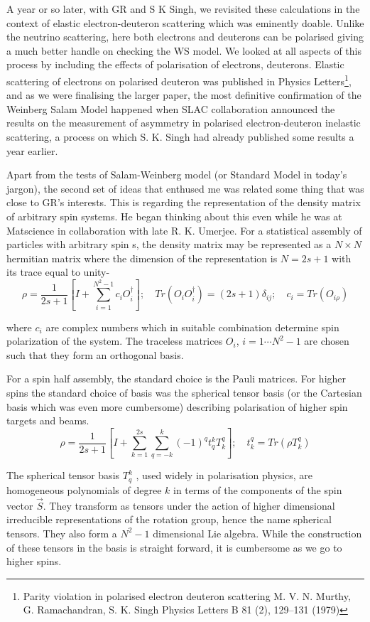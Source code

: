 A year or so later, with GR and S K Singh, we revisited these calculations in the context of elastic electron-deuteron scattering which was eminently doable. Unlike the neutrino scattering, here both electrons and deuterons can be polarised giving a much better handle on checking the WS model. We looked at all aspects of this process by including the effects of polarisation of electrons, deuterons. Elastic scattering of electrons on polarised deuteron was published in Physics Letters\footnote{Parity violation in polarised electron deuteron scattering M. V. N. Murthy, G. Ramachandran, S. K. Singh Physics Letters B 81 (2), 129--131 (1979)}, and as we were finalising the larger paper, the most definitive confirmation of the Weinberg Salam Model happened when SLAC collaboration announced the results on the measurement of asymmetry in polarised electron-deuteron inelastic scattering, a process on which S. K. Singh had already published some results a year earlier.

Apart from the tests of Salam-Weinberg model (or Standard Model in today’s jargon), the second set of ideas that enthused me was related some thing that was close to GR’s interests. This is regarding the representation of the density matrix of arbitrary spin systems. He began thinking about this even while he was at Matscience in collaboration with late R. K. Umerjee. For a statistical assembly of particles with arbitrary spin s, the density matrix may be represented as a $N \times N$ hermitian matrix where the dimension of the representation is $N = 2s + 1$ with its trace equal to unity-
$$
\rho =\dfrac{1}{2s+1}\left[I + \sum\limits_{i=1}^{N^{2}-1} c_{i}O_{i}^{\dagger}\right];\quad Tr(O_{i}O_{i}^{\dagger}) = (2s +1)\delta_{ij}; \quad c_{i}=Tr(O_{i\rho})
$$

\noindent
where $c_{i}$ are complex numbers which in suitable combination determine spin polarization of the system. The traceless matrices $O_{i}$, $i = 1 \cdots N^{2}-1$ are chosen such that they form an orthogonal basis.

For a spin half assembly, the standard choice is the Pauli matrices. For higher spins the standard choice of basis was the spherical tensor basis (or the Cartesian basis which was even more cumbersome) describing polarisation of higher spin targets and beams.
$$
\rho= \dfrac{1}{2s+1}\left[I + \sum\limits_{k=1}^{2s}\sum\limits_{q=-k}^{k}(-1)^{q}t_{q}^{k}T_{k}^{q}\right]; \quad t_{k}^{q}= Tr(\rho T_{k}^{q})
$$

The spherical tensor basis $T_{q}^{k}$ , used widely in polarisation physics, are homogeneous polynomials of degree $k$ in terms of the components of the spin vector $\vec{S}$. They transform as tensors under the action of higher dimensional irreducible representations of the rotation group, hence the name spherical tensors. They also form a $N^{2}-1$ dimensional Lie algebra. While the construction of these tensors in the basis is straight forward, it is cumbersome as we go to higher spins.

